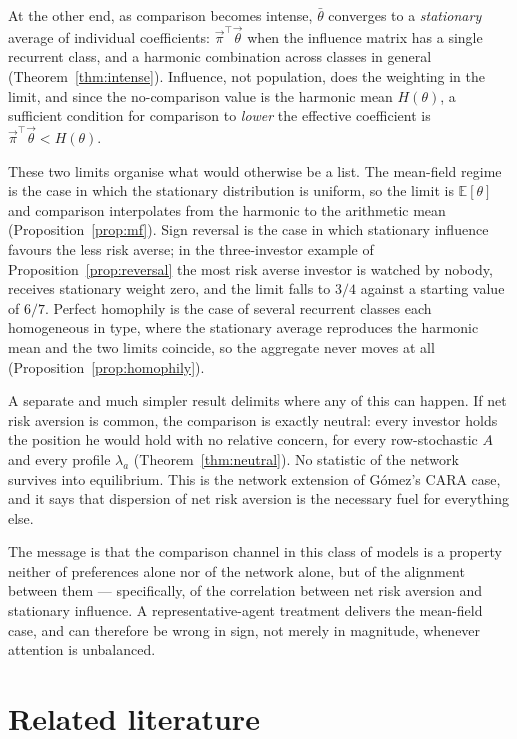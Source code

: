 \documentclass[12pt]{article}
\theoremstyle{definition}
\theoremstyle{remark}
\newcommand{\E}{\mathbb{E}}
\newcommand{\bth}{\bar\theta}
\begin{document}
At the other end, as comparison becomes intense, $\bth$ converges to a
\emph{stationary} average of individual coefficients: $\vec\pi^{\top}\vec\theta$
when the influence matrix has a single recurrent class, and a harmonic
combination across classes in general (Theorem~\ref{thm:intense}). Influence,
not population, does the weighting in the limit, and since the no-comparison
value is the harmonic mean $H(\theta)$, a sufficient condition for comparison to
\emph{lower} the effective coefficient is $\vec\pi^{\top}\vec\theta<H(\theta)$.

These two limits organise what would otherwise be a list. The mean-field
regime is the case in which the stationary distribution is uniform, so the
limit is $\E[\theta]$ and comparison interpolates from the harmonic to the
arithmetic mean (Proposition~\ref{prop:mf}). Sign reversal is the case in which
stationary influence favours the less risk averse; in the three-investor example
of Proposition~\ref{prop:reversal} the most risk averse investor is watched by
nobody, receives stationary weight zero, and the limit falls to $3/4$ against a
starting value of $6/7$. Perfect homophily is the case of several recurrent
classes each homogeneous in type, where the stationary average reproduces the
harmonic mean and the two limits coincide, so the aggregate never moves at all
(Proposition~\ref{prop:homophily}).

A separate and much simpler result delimits where any of this can happen. If net
risk aversion is common, the comparison is exactly neutral: every investor holds
the position he would hold with no relative concern, for every row-stochastic
$A$ and every profile $\lambda_a$ (Theorem~\ref{thm:neutral}). No statistic of
the network survives into equilibrium. This is the network extension of Gómez's
CARA case, and it says that dispersion of net risk aversion is the necessary
fuel for everything else.

The message is that the comparison channel in this class of models is a property
neither of preferences alone nor of the network alone, but of the alignment
between them --- specifically, of the correlation between net risk aversion and
stationary influence. A representative-agent treatment delivers the mean-field
case, and can therefore be wrong in sign, not merely in magnitude, whenever
attention is unbalanced.

\section{Related literature}
\end{document}
